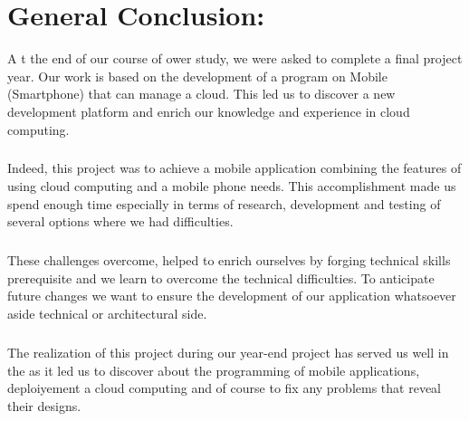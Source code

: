 \chapter{General Conclusion:}
\lettrine[lines=3]{A}{} t the end of our course of ower study, we were asked to complete a final project year. 
Our work is based on the development of a program on Mobile (Smartphone) that can manage a cloud. 
This led us to discover a new development platform and enrich our knowledge and experience in cloud computing.
\paragraph{}Indeed, this project was to achieve a mobile application combining the features of using  cloud computing and a mobile phone needs. 
This accomplishment made us spend enough time especially in terms of research, 
development and testing of several options where we had difficulties.
\paragraph{}These challenges overcome, helped to enrich ourselves by forging technical skills prerequisite and
 we learn to overcome the technical difficulties. 
To anticipate future changes we want to ensure the development of our application whatsoever aside technical or architectural side.
\paragraph{}The realization of this project during our year-end project has served us well in the
as it led us to discover about the programming of mobile applications, deploiyement a cloud computing and of course to fix any problems that reveal their designs.
